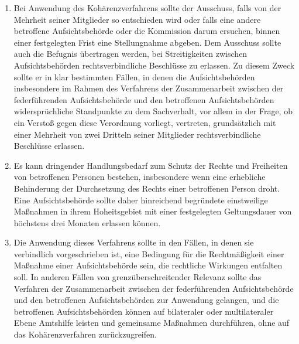 \begin{enumerate}

   \item Bei Anwendung des Kohärenzverfahrens sollte der Ausschuss, falls von der Mehrheit seiner Mitglieder so
    entschieden wird oder falls eine andere betroffene Aufsichtsbehörde oder die Kommission darum ersuchen, binnen
    einer festgelegten Frist eine Stellungnahme abgeben. Dem Ausschuss sollte auch die Befugnis übertragen werden, bei
    Streitigkeiten zwischen Aufsichtsbehörden rechtsverbindliche Beschlüsse zu erlassen. Zu diesem Zweck sollte er in
    klar bestimmten Fällen, in denen die Aufsichtsbehörden insbesondere im Rahmen des Verfahrens der Zusammenarbeit
    zwischen der federführenden Aufsichtsbehörde und den betroffenen Aufsichtsbehörden widersprüchliche Standpunkte zu
    dem Sachverhalt, vor allem in der Frage, ob ein Verstoß gegen diese Verordnung vorliegt, vertreten, grundsätzlich
    mit einer Mehrheit von zwei Dritteln seiner Mitglieder rechtsverbindliche Beschlüsse erlassen.%
   \label{eg:136}
   

   \item Es kann dringender Handlungsbedarf zum Schutz der Rechte und Freiheiten von betroffenen Personen bestehen,
    insbesondere wenn eine erhebliche Behinderung der Durchsetzung des Rechts einer betroffenen Person droht. Eine
    Aufsichtsbehörde sollte daher hinreichend begründete einstweilige Maßnahmen in ihrem Hoheitsgebiet mit einer
    festgelegten Geltungsdauer von höchstens drei Monaten erlassen können.%
   \label{eg:137}
   

   \item Die Anwendung dieses Verfahrens sollte in den Fällen, in denen sie verbindlich vorgeschrieben ist, eine
    Bedingung für die Rechtmäßigkeit einer Maßnahme einer Aufsichtsbehörde sein, die rechtliche Wirkungen entfalten
    soll. In anderen Fällen von grenzüberschreitender Relevanz sollte das Verfahren der Zusammenarbeit zwischen der
    federführenden Aufsichtsbehörde und den betroffenen Aufsichtsbehörden zur Anwendung gelangen, und die betroffenen
    Aufsichtsbehörden können auf bilateraler oder multilateraler Ebene Amtshilfe leisten und gemeinsame Maßnahmen
    durchführen, ohne auf das Kohärenzverfahren zurückzugreifen.%
   \label{eg:138}
   


\end{enumerate}
